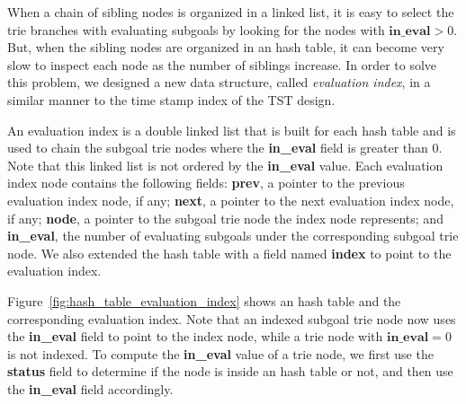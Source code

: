 When a chain of sibling nodes is organized in a linked list, it is
easy to select the trie branches with evaluating subgoals by looking
for the nodes with $\textbf{in\_eval} > 0$. But, when the sibling nodes are
organized in an hash table, it can become very slow to inspect each
node as the number of siblings increase. In order to solve this
problem, we designed a new data structure, called \textit{evaluation
index}, in a similar manner to the time stamp index of the TST design.

An evaluation index is a double linked list that is built for each
hash table and is used to chain the subgoal trie nodes where the
\textbf{in\_eval} field is greater than 0. Note that this linked list is not
ordered by the \textbf{in\_eval} value. Each evaluation index node contains
the following fields: \textbf{prev}, a pointer to the previous evaluation
index node, if any; \textbf{next}, a pointer to the next evaluation index
node, if any; \textbf{node}, a pointer to the subgoal trie node the index
node represents; and \textbf{in\_eval}, the number of evaluating subgoals
under the corresponding subgoal trie node. We also extended the hash
table with a field named \textbf{index} to point to the evaluation index.

Figure~\ref{fig:hash_table_evaluation_index} shows an hash table and
the corresponding evaluation index. Note that an indexed subgoal trie
node now uses the \textbf{in\_eval} field to point to the index node, while a
trie node with $\textbf{in\_eval} = 0$ is not indexed. To compute the
\textbf{in\_eval} value of a trie node, we first use the \textbf{status} field to
determine if the node is inside an hash table or not, and then use the
\textbf{in\_eval} field accordingly.

